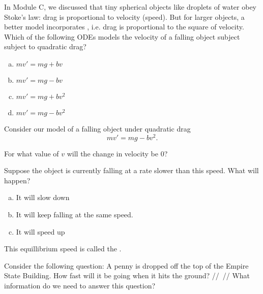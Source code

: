 \begin{applicationActivities}


\begin{activity}{5}
In Module C, we discussed that tiny spherical objects like droplets of water obey Stoke's law: drag is proportional to velocity (speed).  But for larger objects, a better model incorporates , i.e. drag is proportional to the square of velocity.
\vfill
Which of the following ODEs models the velocity of a falling object subject subject to quadratic drag?
\begin{enumerate}[(a)]
\item \(mv'=mg+bv\)
\item \(mv'=mg-bv\)
\item \(mv'=mg+bv^2\)
\item \(mv'=mg-bv^2\)
\end{enumerate}
\end{activity}

\begin{activity}{10}
Consider our model of a falling object under quadratic drag \[mv'=mg-bv^2.\]

\begin{subactivity}
For what value of \(v\) will the change in velocity be \(0\)?
\end{subactivity}
\begin{subactivity}
Suppose the object is currently falling at a rate slower than this speed.  What will happen?
\begin{enumerate}[(a)]
\item It will slow down
\item It will keep falling at the same speed.
\item It will speed up
\end{enumerate}
\end{subactivity}
\end{activity}

\begin{observation}
This equillibrium speed is called the .
\end{observation}

\begin{activity}{5}
Consider the following question:
\vfill
A penny is dropped off the top of the Empire State Building.  How fast will it be going when it hits the ground?
//~//
What information do we need to answer this question?
\end{activity}


\end{applicationActivities}
